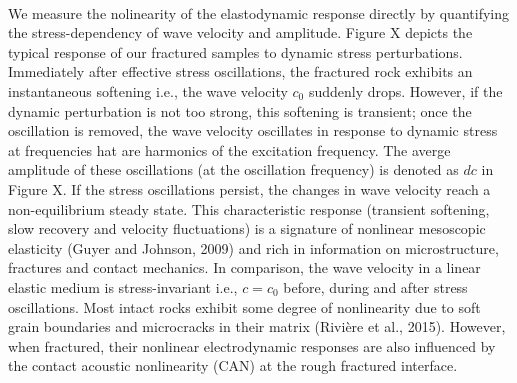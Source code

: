 \documentclass[letterpaper,10pt]{article}
\begin{document}
\paragraph{}
We measure the nolinearity of the elastodynamic response directly by quantifying the stress-dependency of wave velocity and amplitude. Figure X depicts the typical response of our fractured samples to dynamic stress perturbations. Immediately after effective stress oscillations, the fractured rock exhibits an instantaneous softening i.e., the wave velocity $c_0$ suddenly drops. However, if the dynamic perturbation is not too strong, this softening is transient; once the oscillation is removed, the wave velocity oscillates in response to dynamic stress at frequencies hat are harmonics of the excitation frequency. The averge amplitude of these oscillations (at the oscillation frequency) is denoted as $dc$ in Figure X. If the stress oscillations persist, the changes in wave velocity reach a non-equilibrium steady state. This characteristic response (transient softening, slow recovery and velocity fluctuations) is a signature of nonlinear mesoscopic elasticity (Guyer and Johnson, 2009) and rich in information on microstructure, fractures and contact mechanics. In comparison, the wave velocity in a linear elastic medium is stress-invariant i.e., $c = c_0$ before, during and after stress oscillations. Most intact rocks exhibit some degree of nonlinearity due to soft grain boundaries and microcracks in their matrix (Rivière et al., 2015). However, when fractured, their nonlinear electrodynamic responses are also influenced by the contact acoustic nonlinearity (CAN) at the rough fractured interface.  
\end{document}
